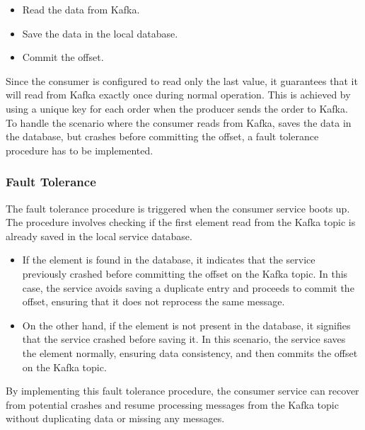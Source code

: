 \documentclass[11pt]{article}
\begin{document}
\begin{itemize}
    \item Read the data from Kafka.
    \item Save the data in the local database.
    \item Commit the offset.
\end{itemize}

Since the consumer is configured to read only the last value, it guarantees that it will read from Kafka exactly once during normal operation. This is achieved by using a unique key for each order when the producer sends the order to Kafka.
\\
To handle the scenario where the consumer reads from Kafka, saves the data in the database, but crashes before committing the offset, a fault tolerance procedure has to be implemented.

\subsubsection{Fault Tolerance}
The fault tolerance procedure is triggered when the consumer service boots up. The procedure involves checking if the first element read from the Kafka topic is already saved in the local service database. 
\begin{itemize}
    \item If the element is found in the database, it indicates that the service previously crashed before committing the offset on the Kafka topic. In this case, the service avoids saving a duplicate entry and proceeds to commit the offset, ensuring that it does not reprocess the same message.
    \item On the other hand, if the element is not present in the database, it signifies that the service crashed before saving it. In this scenario, the service saves the element normally, ensuring data consistency, and then commits the offset on the Kafka topic.
\end{itemize}
By implementing this fault tolerance procedure, the consumer service can recover from potential crashes and resume processing messages from the Kafka topic without duplicating data or missing any messages.
\end{document}
